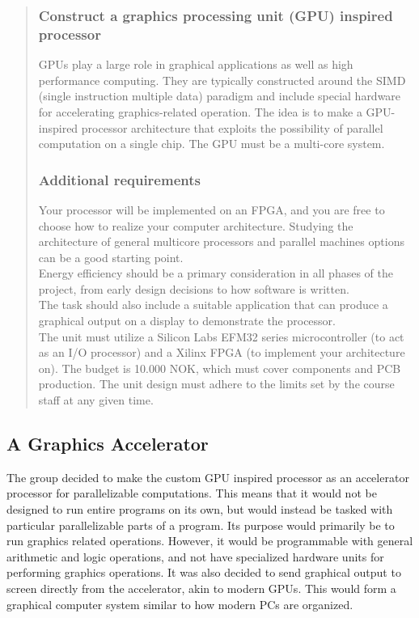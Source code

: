 \documentclass[../main/report.tex]{subfiles}
\begin{document}
\begin{quotation}

	\subsubsection{Construct a graphics processing unit (GPU) inspired processor}
    \noindent GPUs play a large role in graphical applications as well as high performance computing.
    They are typically constructed around the SIMD (single instruction multiple data) paradigm and
    include special hardware for accelerating graphics-related operation. The idea is to make a
    GPU-inspired processor architecture that exploits the possibility of parallel computation on a
    single chip. The GPU must be a multi-core system.
    
    \subsubsection{Additional requirements}
    \noindent Your processor will be implemented on an FPGA, and you are free to choose how to
    realize your computer architecture. Studying the architecture of general multicore processors
    and parallel machines options can be a good starting point.\\
    
    \noindent Energy efficiency should be a primary consideration in all phases of the project, from early
    design decisions to how software is written.\\
    
    \noindent The task should also include a suitable application that can produce a graphical output on a
    display to demonstrate the processor.\\
    
    \noindent The unit must utilize a Silicon Labs EFM32 series microcontroller (to act as an I/O processor)
    and a Xilinx FPGA (to implement your architecture on). The budget is 10.000 NOK, which must
    cover components and PCB production. The unit design must adhere to the limits set by the
    course staff at any given time.
\end{quotation}
\newpage

\subsection{A Graphics Accelerator}

The group decided to make the custom GPU inspired processor as an accelerator processor for parallelizable computations.
This means that it would not be designed to run entire programs on its own, but would instead be tasked with particular parallelizable parts of a program.
Its purpose would primarily be to run graphics related operations.
However, it would be programmable with general arithmetic and logic operations, and not have specialized hardware units for performing graphics operations.
It was also decided to send graphical output to screen directly from the accelerator, akin to modern GPUs.
This would form a graphical computer system similar to how modern PCs are organized.
\end{document}

